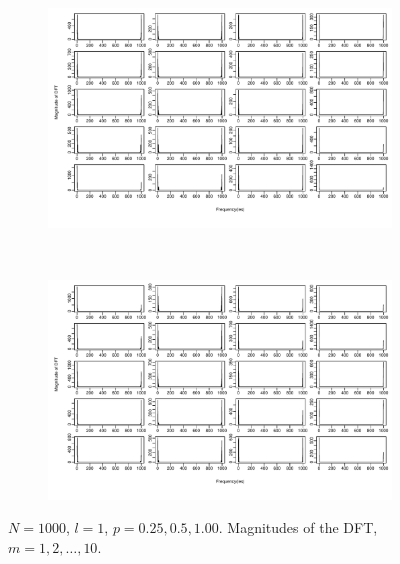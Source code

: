 \documentclass[11pt, a4paper]{article} %
\begin{document}
\begin{figure}
\begin{subfigure}{1.1\textwidth}
  \centering
  \includegraphics[width=\linewidth]{N1000_MagnDFT_l1_m_1_5.pdf}
  \label{fig:sfig1}
\end{subfigure}\\
\begin{subfigure}{1.1\textwidth}
  \centering
  \includegraphics[width=\linewidth]{N1000_MagnDFT_l1_m_6_10.pdf}
  \label{fig:sfig2}
\end{subfigure}
\label{fig1}
\caption{$N = 1000$, $l = 1$, $p = 0.25, 0.5, 1.00$. Magnitudes of the DFT, $m = 1,2, \dots, 10$.}
\end{figure}

\restoregeometry


\end{document}
